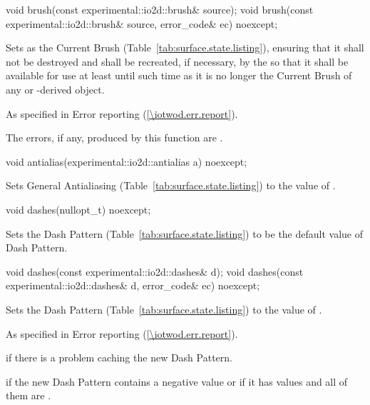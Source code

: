 \begin{itemdecl}
void brush(const experimental::io2d::brush& source);
void brush(const experimental::io2d::brush& source,
  error_code& ec) noexcept;
\end{itemdecl}
\begin{itemdescr}
\pnum
\effects
Sets  as the Current Brush (Table~\ref{tab:surface.state.listing}), ensuring that it shall not be destroyed and shall be recreated, if necessary, by the \underlyingrendandpresenttechs so that it shall be available for use at least until such time as it is no longer the Current Brush of any  or -derived object.

\pnum
\throws
As specified in Error reporting (\ref{\iotwod.err.report}).

\pnum
\errors
The errors, if any, produced by this function are .
\end{itemdescr}

\begin{itemdecl}
void antialias(experimental::io2d::antialias a) noexcept;
\end{itemdecl}
\begin{itemdescr}
\pnum
\effects
Sets General Antialiasing (Table~\ref{tab:surface.state.listing}) to the value of .
\end{itemdescr}

\begin{itemdecl}
void dashes(nullopt_t) noexcept;
\end{itemdecl}
\begin{itemdescr}
\pnum
\effects
Sets the Dash Pattern (Table~\ref{tab:surface.state.listing}) to be the default value of Dash Pattern.
\end{itemdescr}

\begin{itemdecl}
void dashes(const experimental::io2d::dashes& d);
void dashes(const experimental::io2d::dashes& d, error_code& ec) noexcept;
\end{itemdecl}
\begin{itemdescr}
\pnum
\effects
Sets the Dash Pattern (Table~\ref{tab:surface.state.listing}) to the value of .

\pnum
\throws
As specified in Error reporting (\ref{\iotwod.err.report}).

\pnum
\errors
{} if there is a problem caching the new Dash Pattern.

\pnum
{} if the new Dash Pattern contains a negative value or if it has values and all of them are .
\end{itemdescr}

